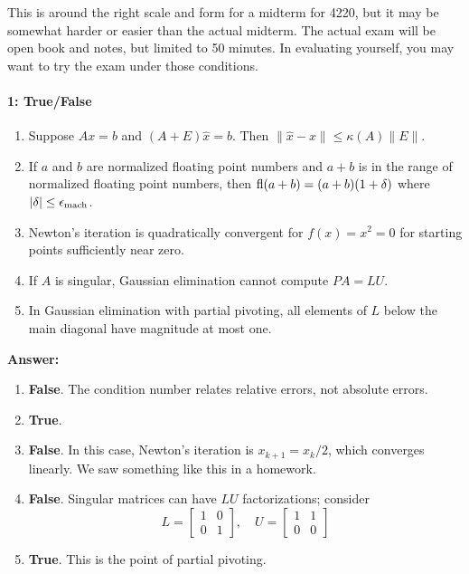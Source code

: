 \documentclass[12pt, leqno]{article}
\begin{document}

This is around the right scale and form for a midterm for 4220, but it may
be somewhat harder or easier than the actual midterm.  The actual exam
will be open book and notes, but limited to 50 minutes.  In evaluating
yourself, you may want to try the exam under those conditions.

\paragraph*{1: True/False}
\begin{enumerate}
\item
  Suppose $Ax = b$ and $(A+E) \hat{x} = b$.
  Then $\|\hat{x}-x\| \leq \kappa(A) \|E\|$.
\item
  If $a$ and $b$ are normalized floating point numbers and $a+b$ is in
  the range of normalized floating point numbers, then
  $\operatorname{fl}(a+b) = (a+b)(1+\delta)$ where $|\delta| \leq \epsilon_{\mathrm{mach}}$.
\item
  Newton's iteration is quadratically convergent for $f(x) = x^2 = 0$
  for starting points sufficiently near zero.
\item
  If $A$ is singular, Gaussian elimination cannot compute $PA = LU$.
\item
  In Gaussian elimination with partial pivoting, all elements of $L$
  below the main diagonal have magnitude at most one.
\end{enumerate}

{\bf Answer:}
\begin{enumerate}
\item {\bf False}.  The condition number relates relative errors, not
  absolute errors.
\item {\bf True}.
\item {\bf False}.  In this case, Newton's iteration is $x_{k+1} =
  x_k/2$, which converges linearly.  We saw something like this in a
  homework.
\item {\bf False}.  Singular matrices can have $LU$ factorizations;
  consider
  \[
  L = \begin{bmatrix} 1 & 0 \\ 0 & 1 \end{bmatrix}, \quad
  U = \begin{bmatrix} 1 & 1 \\ 0 & 0 \end{bmatrix}
  \]
\item {\bf True}.  This is the point of partial pivoting.
\end{enumerate}
\end{document}
